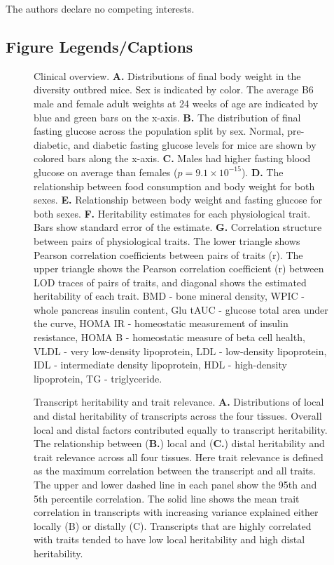\documentclass[
]{article}
\begin{document}
The authors declare no competing interests.

\subsection{Figure Legends/Captions}\label{figure-legendscaptions}

\begin{figure}[ht!]
\caption{ Clinical overview. \textbf{A.} Distributions of final body 
weight in the diversity outbred mice. Sex is indicated by color. 
The average B6 male and female adult weights at 24 weeks of 
age are indicated by blue and green bars on the x-axis. \textbf{B.} 
The distribution of final fasting glucose across the population split 
by sex. Normal, pre-diabetic, and diabetic fasting glucose levels for 
mice are shown by colored bars along the x-axis. \textbf{C.} Males 
had higher fasting blood glucose on average than females 
($p = 9.1\times10^{-15}$). \textbf{D.} The relationship between 
food consumption and body weight for both sexes. \textbf{E.} 
Relationship between body weight and fasting glucose for both 
sexes. \textbf{F.} Heritability estimates for each physiological trait. 
Bars show standard error of the estimate. \textbf{G.} Correlation 
structure between pairs of physiological traits. The lower triangle 
shows Pearson correlation coefficients between pairs of traits (r). 
The upper triangle shows the Pearson correlation coefficient (r) 
between LOD traces of pairs of traits, and diagonal shows the 
estimated heritability of each trait. BMD - bone mineral density,
WPIC - whole pancreas insulin content, Glu tAUC - glucose total area under 
the curve, HOMA IR - homeostatic measurement of insulin resistance, HOMA B - 
homeostatic measure of beta cell health, VLDL - very low-density lipoprotein,
LDL - low-density lipoprotein, IDL - intermediate density lipoprotein, 
HDL - high-density lipoprotein, TG - triglyceride.
}
\label{fig:trait_overview}
\end{figure}

\begin{figure}[ht!]
\caption{Transcript heritability and trait relevance. 
\textbf{A.} Distributions of local and distal heritability 
of transcripts across the four tissues. Overall local and 
distal factors contributed equally to transcript heritability. 
The relationship between (\textbf{B.}) local and (\textbf{C.}) 
distal heritability and trait relevance across all four 
tissues. Here trait relevance is defined as the maximum 
correlation between the transcript and all traits. The upper 
and lower dashed line in each panel show the 95th and 5th 
percentile correlation. The solid line shows the mean trait 
correlation in transcripts with increasing variance explained 
either locally (B) or distally (C). Transcripts that are highly 
correlated with traits tended to have low local heritability and 
high distal heritability.}
\label{fig:motivation}
\end{figure}
\end{document}
